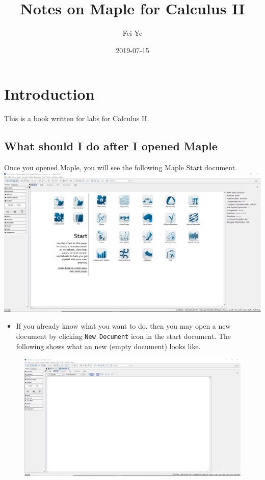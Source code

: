\documentclass[]{book}
\title{Notes on Maple for Calculus II}
\author{Fei Ye}
\date{2019-07-15}
\providecommand{\tightlist}{%
  \setlength{\itemsep}{0pt}\setlength{\parskip}{0pt}}
\theoremstyle{definition}
\theoremstyle{definition}
\theoremstyle{definition}
\theoremstyle{remark}
\begin{document}
\maketitle

{
\setcounter{tocdepth}{1}
\tableofcontents
}
\chapter*{Introduction}\label{introduction}

This is a book written for labs for Calculus II.

\section*{What should I do after I opened
Maple}\label{what-should-i-do-after-i-opened-maple}

Once you opened Maple, you will see the following Maple Start document.
\includegraphics{figs/Maple-Start.png}

\begin{itemize}
\tightlist
\item
  If you already know what you want to do, then you may open a new
  document by clicking \texttt{New\ Document} icon in the start
  document. The following shows what an new (empty document) looks like.
\end{itemize}

\begin{figure}
\centering
\includegraphics{figs/Maple-New-Doc.png}
\caption{}
\end{figure}
\end{document}
